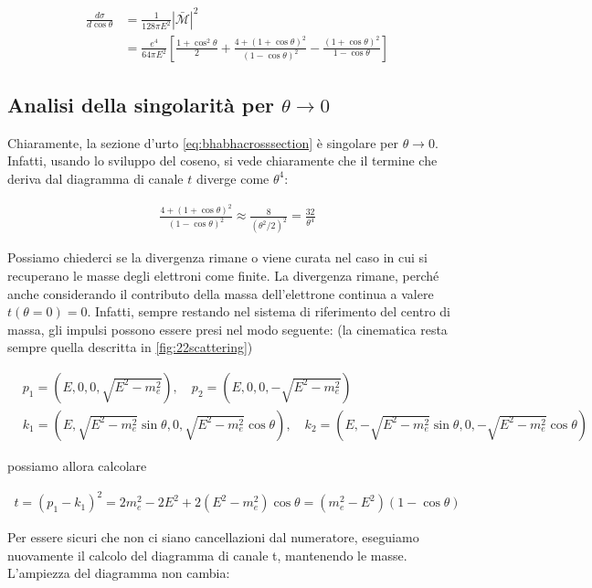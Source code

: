 \documentclass[11pt]{report}
\begin{document}
\begin{align}
    \frac{d\sigma}{d\cos\theta} &= \frac{1}{128\pi E^2}|\mathcal{\bar{M}}|^2 \\
    \label{eq:bhabhacrosssection}
    &= \frac{e^4}{64\pi E^2}\left[\frac{1+\cos^2\theta}{2} + \frac{4+ (1+\cos\theta)^2}{(1-\cos\theta)^2} - \frac{(1+\cos\theta)^2}{1-\cos\theta}\right]
\end{align}

\subsection{Analisi della singolarità per \(\theta \rightarrow 0\)}

Chiaramente, la sezione d'urto \ref{eq:bhabhacrosssection} è singolare per \(\theta \rightarrow 0\). Infatti, usando lo sviluppo del coseno, si vede chiaramente che il termine che deriva dal diagramma di canale \(t\) diverge come \(\theta^4\): 

\begin{align}
    \frac{4+ (1+\cos\theta)^2}{(1-\cos\theta)^2} \approx \frac{8}{(\theta^2/2)^2} = \frac{32}{\theta^4}
\end{align}

Possiamo chiederci se la divergenza rimane o viene curata nel caso in cui si recuperano le masse degli elettroni come finite. La divergenza rimane, perché anche considerando il contributo della massa dell'elettrone continua a valere \(t(\theta =0) =0\). Infatti, sempre restando nel sistema di riferimento del centro di massa, gli impulsi possono essere presi nel modo seguente: (la cinematica resta sempre quella descritta in \ref{fig:22scattering})

\begin{align}
    &p_1 = (E, 0 , 0, \sqrt{E^2-m_e^2}), \quad p_2 = (E, 0, 0, -\sqrt{E^2-m_e^2}) \\
    &k_1 = (E, \sqrt{E^2-m_e^2}\sin\theta, 0, \sqrt{E^2-m_e^2}\cos\theta), \quad k_2 = (E, -\sqrt{E^2-m_e^2}\sin\theta, 0, -\sqrt{E^2-m_e^2}\cos\theta)
\end{align} 

possiamo allora calcolare

\begin{align}
    t = (p_1 - k_1)^2 = 2m_e^2 - 2E^2 + 2(E^2-m_e^2)\cos\theta = (m_e^2 - E^2)(1-\cos\theta)
\end{align}


Per essere sicuri che non ci siano cancellazioni dal numeratore, eseguiamo nuovamente il calcolo del diagramma di canale t, mantenendo le masse. L'ampiezza del diagramma non cambia: 
\end{document}
